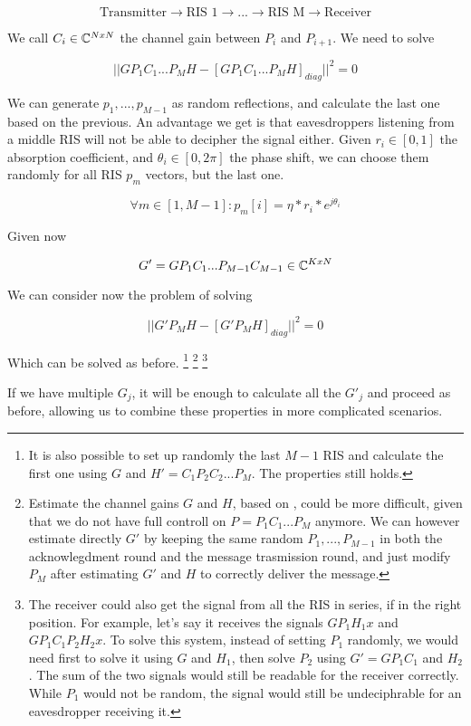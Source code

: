 \begin{equation}
  \text{Transmitter} \rightarrow \text{RIS 1} \rightarrow ... \rightarrow \text{RIS M} \rightarrow \text{Receiver}
\end{equation}

We call $C_i \in \mathbb{C}^{NxN}$ the channel gain between $P_i$ and $P_{i+1}$. We need to solve

\begin{equation}
  || GP_1C_1...P_MH - [GP_1C_1...P_MH]_{diag} || ^2 = 0
\end{equation}

We can generate $p_1, ..., p_{M-1}$ as random reflections, and calculate the last one based on the previous. An advantage we get is that eavesdroppers listening from a middle RIS will not be able to decipher the signal either. Given $r_i \in [0, 1]$ the absorption coefficient, and $\theta_i \in [0, 2\pi]$ the phase shift, we can choose them randomly for all RIS $p_m$ vectors, but the last one.

\begin{equation}
  \forall m \in [1, M-1] : p_m[i] = \eta * r_i * e^{j\theta_i}
\end{equation}

Given now

\begin{equation}
  G' = GP_1C_1...P_{M-1}C_{M-1} \in \mathbb{C}^{KxN}
\end{equation}

We can consider now the problem of solving

\begin{equation}
  || G'P_MH - [G'P_MH]_{diag} || ^2 = 0
\end{equation}

Which can be solved as before.
\footnote{It is also possible to set up randomly the last $M-1$ RIS and calculate the first one using $G$ and $H'=C_1P_2C_2...P_M$. The properties still holds.}
\footnote{Estimate the channel gains $G$ and $H$, based on \cite{8879620}, could be more difficult, given that we do not have full controll on $P=P_1C_1...P_M$ anymore. We can however estimate directly $G'$ by keeping the same random $P_1, ..., P_{M-1}$ in both the acknowlegdment round and the message trasmission round, and just modify $P_M$ after estimating $G'$ and $H$ to correctly deliver the message.}
\footnote{The receiver could also get the signal from all the RIS in series, if in the right position. For example, let's say it receives the signals $GP_1H_1x$ and $GP_1C_1P_2H_2x$. To solve this system, instead of setting $P_1$ randomly, we would need first to solve it using $G$ and $H_1$, then solve $P_2$ using $G'=GP_1C_1$ and $H_2$. The sum of the two signals would still be readable for the receiver correctly. While $P_1$ would not be random, the signal would still be undeciphrable for an eavesdropper receiving it.}

If we have multiple $G_j$, it will be enough to calculate all the $G'_j$ and proceed as before, allowing us to combine these properties in more complicated scenarios.
